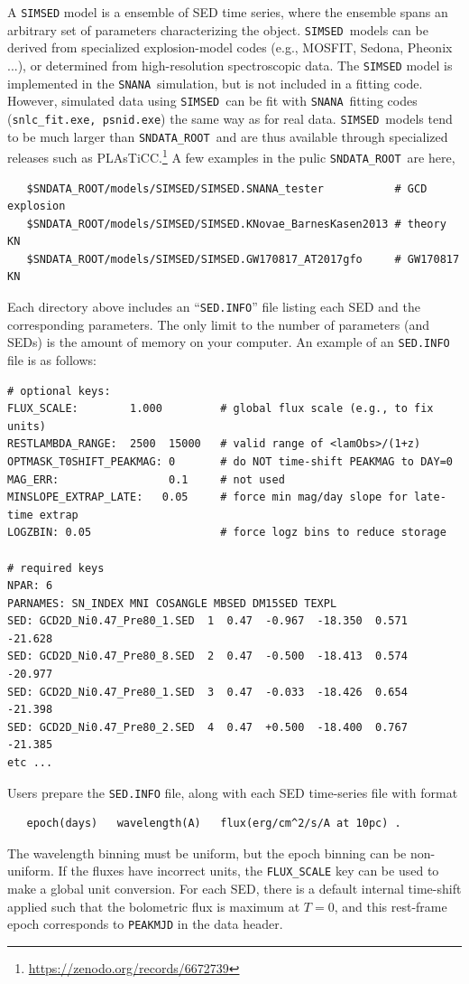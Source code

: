 \documentclass[12pt]{article}
\newcommand{\SIMSED}{{\tt SIMSED}}
\newcommand{\snana}{{\tt SNANA}}
\newcommand{\sndataroot}{{\tt SNDATA\_ROOT}}
\begin{document}
A {\SIMSED} model is a ensemble of SED time series, 
where the ensemble spans an arbitrary set of parameters
characterizing the object.
\SIMSED\ models can be derived from specialized explosion-model 
codes (e.g., MOSFIT, Sedona, Pheonix ...),
or determined from high-resolution spectroscopic data.
The {\SIMSED} model is implemented in the \snana\
simulation, but is not included in a fitting code. 
However, simulated data using \SIMSED\ can be fit with \snana\
fitting codes ({\tt snlc\_fit.exe, psnid.exe}) the same way as for real data.
\SIMSED\ models tend to be much larger than \sndataroot\ and are thus
available through specialized releases such as
PLAsTiCC.\footnote{\url{https://zenodo.org/records/6672739}}
A few examples in the pulic \sndataroot\ are here,
%
\begin{verbatim}
   $SNDATA_ROOT/models/SIMSED/SIMSED.SNANA_tester           # GCD explosion
   $SNDATA_ROOT/models/SIMSED/SIMSED.KNovae_BarnesKasen2013 # theory KN
   $SNDATA_ROOT/models/SIMSED/SIMSED.GW170817_AT2017gfo     # GW170817 KN
\end{verbatim}
%
Each directory above includes an ``{\tt SED.INFO}'' file listing
each SED and the corresponding parameters.
The only limit to the number of parameters (and SEDs)
is the amount of memory on your computer. 
An example of an {\tt SED.INFO} file is as follows:
\begin{Verbatim}[frame=single]
# optional keys:
FLUX_SCALE:        1.000         # global flux scale (e.g., to fix units)
RESTLAMBDA_RANGE:  2500  15000   # valid range of <lamObs>/(1+z)
OPTMASK_T0SHIFT_PEAKMAG: 0       # do NOT time-shift PEAKMAG to DAY=0
MAG_ERR:                 0.1     # not used
MINSLOPE_EXTRAP_LATE:   0.05     # force min mag/day slope for late-time extrap
LOGZBIN: 0.05                    # force logz bins to reduce storage

# required keys
NPAR: 6
PARNAMES: SN_INDEX MNI COSANGLE MBSED DM15SED TEXPL
SED: GCD2D_Ni0.47_Pre80_1.SED  1  0.47  -0.967  -18.350  0.571  -21.628
SED: GCD2D_Ni0.47_Pre80_8.SED  2  0.47  -0.500  -18.413  0.574  -20.977
SED: GCD2D_Ni0.47_Pre80_1.SED  3  0.47  -0.033  -18.426  0.654  -21.398
SED: GCD2D_Ni0.47_Pre80_2.SED  4  0.47  +0.500  -18.400  0.767  -21.385
etc ...
\end{Verbatim}
Users prepare the {\tt SED.INFO} file, along with each
SED time-series file with format
\begin{verbatim}
   epoch(days)   wavelength(A)   flux(erg/cm^2/s/A at 10pc) .
\end{verbatim}
The wavelength binning must be uniform, but the epoch binning
can be non-uniform.
If the fluxes have incorrect units, the {\tt FLUX\_SCALE} key
can be used to make a global unit conversion. 
For each SED, there is a default internal time-shift 
applied such that the bolometric flux is maximum at $T=0$,
and this rest-frame epoch corresponds to {\tt PEAKMJD} in the data header.
\end{document}
